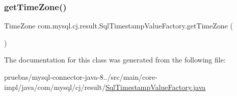 \subsubsection{\texorpdfstring{get\+Time\+Zone()}{getTimeZone()}}
{\footnotesize\ttfamily Time\+Zone com.\+mysql.\+cj.\+result.\+Sql\+Timestamp\+Value\+Factory.\+get\+Time\+Zone (\begin{DoxyParamCaption}{ }\end{DoxyParamCaption})}



The documentation for this class was generated from the following file\+:\begin{DoxyCompactItemize}
\item 
pruebas/mysql-\/connector-\/java-\/8../src/main/core-\/impl/java/com/mysql/cj/result/\mbox{\hyperlink{_sql_timestamp_value_factory_8java}{Sql\+Timestamp\+Value\+Factory.\+java}}\end{DoxyCompactItemize}
